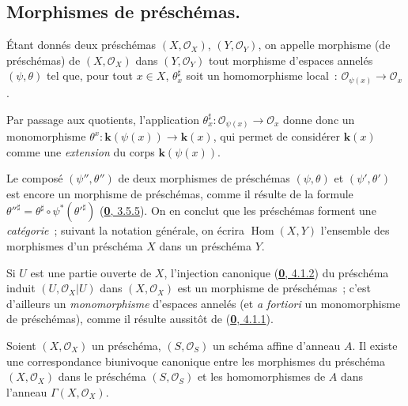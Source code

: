 \subsection{Morphismes de préschémas.}
\label{subsection:I.2.2-fr}
\label{I.2.2-fr}

\begin{definition}[2.2.1]
\label{I.2.2.1-fr}
Étant donnés deux préschémas $(X,\mathscr{O}_X)$, $(Y,\mathscr{O}_Y)$, on
appelle morphisme (de préschémas) de $(X,\mathscr{O}_X)$ dans
$(Y,\mathscr{O}_Y)$ tout morphisme d'espaces annelés $(\psi,\theta)$ tel que,
pour tout $x\in X$, $\theta_x^\sharp$ soit un homomorphisme local~:
$\mathscr{O}_{\psi(x)}\longrightarrow\mathscr{O}_x$.
\end{definition}


Par passage aux quotients, l'application
$\theta_x^\sharp:\mathscr{O}_{\psi(x)}\to\mathscr{O}_x$ donne donc un
monomorphisme $\theta^x:\boldsymbol{k}(\psi(x))\to\boldsymbol{k}(x)$, qui permet de considérer $\boldsymbol{k}(x)$
comme une \emph{extension} du corps $\boldsymbol{k}(\psi(x))$.

\begin{env}[2.2.2]
\label{I.2.2.2-fr}
Le composé $(\psi'',\theta'')$ de deux morphismes de préschémas
$(\psi,\theta)$ et $(\psi',\theta')$ est encore un morphisme de préschémas,
comme il résulte de la formule
${\theta''}^\sharp=\theta^\sharp\circ\psi^*({\theta'}^\sharp)$
(\hyperref[0.3.5.5-fr]{\textbf{0}, 3.5.5}). On en conclut que les préschémas forment
une \emph{catégorie}~; suivant la notation générale, on écrira
$\operatorname{Hom}(X,Y)$ l'ensemble des morphismes d'un préschéma $X$ dans
un préschéma $Y$.
\end{env}

\begin{example}[2.2.3]
\label{I.2.2.3-fr}
Si $U$ est une partie ouverte de $X$, l'injection canonique
(\hyperref[0.4.1.2-fr]{\textbf{0}, 4.1.2}) du préschéma induit
$(U,\mathscr{O}_X|U)$ dans $(X,\mathscr{O}_X)$ est un morphisme de
préschémas~; c'est d'ailleurs un \emph{monomorphisme} d'espaces annelés (et
\emph{a fortiori} un monomorphisme de préschémas), comme il résulte aussitôt
de (\hyperref[0.4.1.1-fr]{\textbf{0}, 4.1.1}).
\end{example}

\begin{proposition}[2.2.4]
\label{I.2.2.4-fr}
Soient $(X,\mathscr{O}_X)$ un préschéma, $(S,\mathscr{O}_S)$ un schéma affine
d'anneau $A$. Il existe une correspondance biunivoque canonique entre les
morphismes du préschéma $(X,\mathscr{O}_X)$ dans le préschéma
$(S,\mathscr{O}_S)$ et les homomorphismes de $A$ dans l'anneau
$\Gamma(X,\mathscr{O}_X)$.
\end{proposition}

